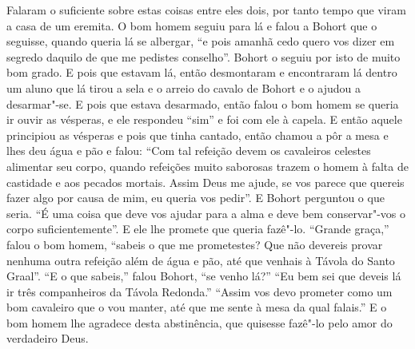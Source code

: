 Falaram o suficiente sobre estas coisas entre eles dois, por tanto tempo que
viram a casa de um eremita. O bom homem seguiu para lá e falou a Bohort que o
seguisse, quando queria lá se albergar, “e pois amanhã cedo quero vos dizer em
segredo daquilo de que me pedistes conselho”. Bohort o seguiu por isto de muito
bom grado. E pois que estavam lá, então desmontaram e encontraram lá dentro um
aluno que lá tirou a sela e o arreio do cavalo de Bohort e o ajudou a
desarmar"-se. E pois que estava desarmado, então falou o bom homem se queria ir
ouvir as vésperas, e ele respondeu “sim” e foi com ele à capela. E então aquele
principiou as vésperas e pois que tinha cantado, então chamou a pôr a mesa e
lhes deu água e pão e falou: ``Com tal refeição devem os cavaleiros celestes
alimentar seu corpo, quando refeições muito saborosas trazem o homem à falta de
castidade e aos pecados mortais. Assim Deus me ajude, se vos parece
que quereis fazer algo por causa de mim, eu queria vos pedir”. E Bohort
perguntou o que seria. “É uma coisa que deve vos ajudar para a alma e deve bem
conservar"-vos o corpo suficientemente”. E ele lhe promete que queria fazê"-lo.
“Grande graça,” falou o bom homem, “sabeis o que me prometestes? Que não
devereis provar nenhuma outra refeição além de água e pão, até que venhais à
Távola do Santo Graal”. “E o que sabeis,” falou Bohort, “se venho
lá?” “Eu bem sei que deveis lá ir três companheiros da Távola Redonda.” “Assim
vos devo prometer como um bom cavaleiro que o vou manter, até que me sente à
mesa da qual falais.” E o bom homem lhe agradece desta abstinência,
que quisesse fazê"-lo pelo amor do verdadeiro Deus.

